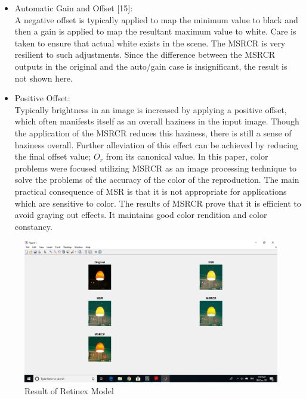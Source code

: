 \begin{itemize}
	\item Automatic Gain and Offset [15]:\\
	A negative offset is typically applied to map the
minimum value to black and then a gain is applied to
map the resultant maximum value to white. Care is taken
to ensure that actual white exists in the scene. The
MSRCR is very resilient to such adjustments. Since the
difference between the MSRCR outputs in the original
and the auto/gain case is insignificant, the result is not
shown here.

\end{itemize}

\begin{itemize}
	\item Positive Offset:\\
	Typically brightness in an image is increased by applying
a positive offset, which often manifests itself as an
overall haziness in the input image. Though the
application of the MSRCR reduces this haziness, there is
still a sense of haziness overall. Further alleviation of this
effect can be achieved by reducing the final offset value;
$O_{r}$ from its canonical value.
In this paper, color problems were focused utilizing
MSRCR as an image processing technique to solve the
problems of the accuracy of the color of the reproduction.
The main practical consequence of MSR is that it is not
appropriate for applications which are sensitive to color.
The results of MSRCR prove that it is efficient to avoid
graying out effects. It maintains good color rendition and
color constancy.
\end{itemize}

\begin{figure}
	\includegraphics[scale=0.5]{images/ch3/retinexModel.jpg}
	\caption{Result of Retinex Model}
\end{figure}






